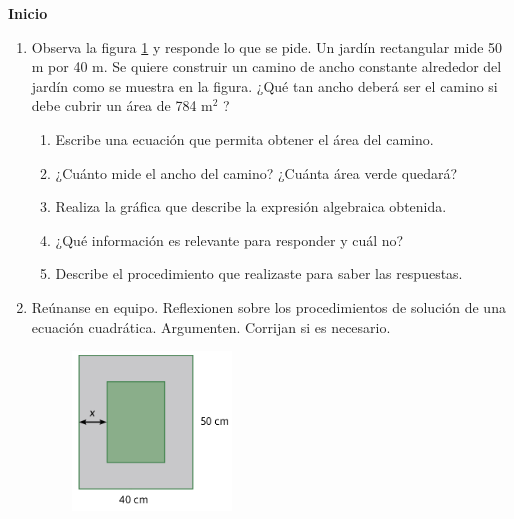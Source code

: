 \documentclass[11pt]{book}
\begin{document}
\begin{boxK}
  \begin{center}\textbf{Inicio}\end{center}
  \begin{enumerate}
    \item Observa la figura \ref{fig:camino} y responde lo que se pide.
          Un jardín rectangular mide 50 m por 40 m. Se quiere construir un camino de ancho
          constante alrededor del jardín como se muestra en la figura. ¿Qué tan ancho deberá
          ser el camino si debe cubrir un área de 784 m$^2$ ?
          \begin{enumerate}
            \item Escribe una ecuación que permita obtener el área del camino.
            \item ¿Cuánto mide el ancho del camino? ¿Cuánta área verde quedará?
            \item Realiza la gráfica que describe la expresión algebraica obtenida.
            \item ¿Qué información es relevante para responder y cuál no?
            \item Describe el procedimiento que realizaste para saber las respuestas.
          \end{enumerate}
    \item Reúnanse en equipo. Reflexionen sobre los procedimientos de solución
          de una ecuación cuadrática. Argumenten. Corrijan si es necesario.
          \begin{figure}[H]
            \centering
            \includegraphics[width=0.4\textwidth]{camino.png}
            \label{fig:camino}
          \end{figure}
  \end{enumerate}
\end{boxK}

\newpage
\end{document}

